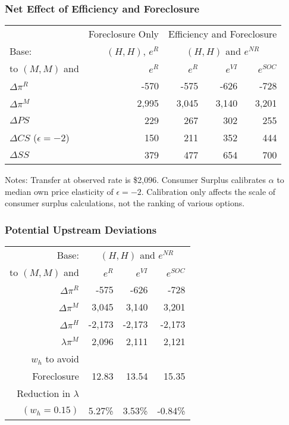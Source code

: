\documentclass[aspectratio=169]{beamer}
\begin{document}
\begin{frame}[label=neteffect]
\frametitle{Net Effect of Efficiency and Foreclosure}
\begin{table}[htp]
\begin{center}
\begin{tabular}{| l | r | r r r|} 
\hline
&Foreclosure Only&\multicolumn{3}{c|}{Efficiency and Foreclosure}\\
Base:  &$(H,H)$, $e^{R}$& \multicolumn{3}{c|}{ $(H,H)$ and $e^{NR}$} \\ 
to  $(M,M)$ and &$e^R$& $e^{R}$ & $e^{VI}$ & $e^{SOC}$ \\ \hline
$\Delta \pi^R$  & -570& -575 & -626 & -728 \\
$\Delta \pi^M$  & 2,995 & 3,045 & 3,140 & 3,201 \\
$\Delta PS$  & 229 & 267 & 302 & 255 \\
$\Delta CS$ ($\epsilon=-2$) & 150 & 211 & 352 & 444 \\
$\Delta SS$  & 379 & 477 & 654 & 700 \\ \hline
\end{tabular}
\end{center}
\footnotesize
\label{tab:both}
\end{table}
Notes: Transfer at observed rate is \$2,096. Consumer Surplus calibrates $\alpha$ to median own price elasticity of $\epsilon=-2$. Calibration only affects the scale of consumer surplus calculations, not the ranking of various options. 
\hyperlink{more}{}
\end{frame}

\begin{frame}[label=deviations]
\frametitle{Potential Upstream Deviations}
\footnotesize
\begin{table}[htp]
\begin{center}
\begin{tabular}{| r | r r r|} 
\hline
\multicolumn{1}{|r|}{Base: } & \multicolumn{3}{c|}{ $(H,H)$ and $e^{NR}$} \\ 
\multicolumn{1}{|r|}{to  $(M,M)$ and} & $e^{R}$ & $e^{VI}$ & $e^{SOC}$ \\ \hline
$\Delta \pi^R$ & -575 & -626 & -728 \\
$\Delta \pi^M$ & 3,045 & 3,140 & 3,201 \\
$\Delta \pi^H$ & -2,173 & -2,173 & -2,173 \\
$\lambda \pi^M$ & 2,096 & 2,111 & 2,121 \\ \hline
$w_h$ to avoid &&&\\
Foreclosure  & 12.83 & 13.54 & 15.35 \\
Reduction in $\lambda$ &&&\\
$(w_h=0.15)$  & 5.27\% & 3.53\% & -0.84\% \\ \hline
\end{tabular}
\end{center}
\label{tab:discount}
\end{table}
\hyperlink{moredeviations}{}
\end{frame}
\end{document}
